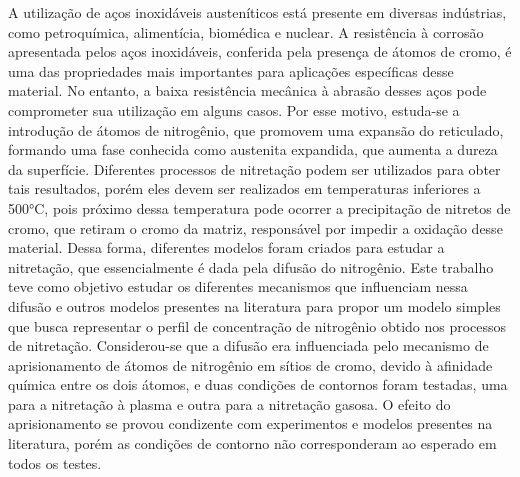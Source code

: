 A utilização de aços inoxidáveis austeníticos está presente em diversas indústrias, como petroquímica, alimentícia, biomédica e nuclear. A resistência à corrosão apresentada pelos aços inoxidáveis, conferida pela presença de átomos de cromo, é uma das propriedades mais importantes para aplicações específicas desse material. No entanto, a baixa resistência mecânica à abrasão desses aços pode comprometer sua utilização em alguns casos. Por esse motivo, estuda-se a introdução de átomos de nitrogênio, que promovem uma expansão do reticulado, formando uma fase conhecida como austenita expandida, que aumenta a dureza da superfície. Diferentes processos de nitretação podem ser utilizados para obter tais resultados, porém eles devem ser realizados em temperaturas inferiores a 500°C, pois próximo dessa temperatura pode ocorrer a precipitação de nitretos de cromo, que retiram o cromo da matriz, responsável por impedir a oxidação desse material. Dessa forma, diferentes modelos foram criados para estudar a nitretação, que essencialmente é dada pela difusão do nitrogênio. Este trabalho teve como objetivo estudar os diferentes mecanismos que influenciam nessa difusão e outros modelos presentes na literatura para propor um modelo simples que busca representar o perfil de concentração de nitrogênio obtido nos processos de nitretação. Considerou-se que a difusão era influenciada pelo mecanismo de aprisionamento de átomos de nitrogênio em sítios de cromo, devido à afinidade química entre os dois átomos, e duas condições de contornos foram testadas, uma para a nitretação à plasma e outra para a nitretação gasosa. O efeito do aprisionamento se provou condizente com experimentos e modelos presentes na literatura, porém as condições de contorno não corresponderam ao esperado em todos os testes.